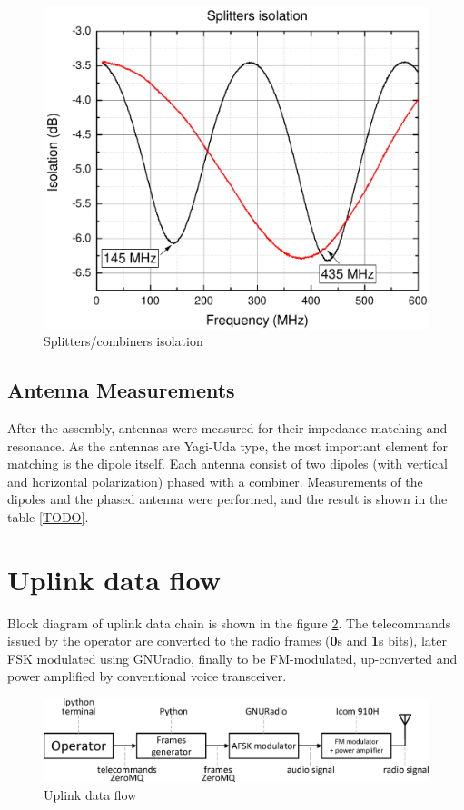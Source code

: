 \begin{figure}
    \centering
    \includegraphics[width=0.6\paperwidth]{img/5/splitter_isolation.pdf}
    \caption{Splitters/combiners isolation}
    \label{splitter_isolation}
\end{figure}


\subsection{Antenna Measurements}
After the assembly, antennas were measured for their impedance matching and resonance. As the antennas are Yagi-Uda type, the most important element for matching is the dipole itself. Each antenna consist of two dipoles (with vertical and horizontal polarization) phased with a combiner. Measurements of the dipoles and the phased antenna were performed, and the result is shown in the table \ref{TODO}.


\section{Uplink data flow}
Block diagram of uplink data chain is shown in the figure \ref{uplink_data_flow}. The telecommands issued by the operator are converted to the radio frames (\textbf{0}s and \textbf{1}s bits), later FSK modulated using GNUradio, finally to be FM-modulated, up-converted and power amplified by conventional voice transceiver.

\begin{figure}
    \centering
    \includegraphics[width=0.6\paperwidth]{img/5/uplink_data_flow.eps}
    \caption{Uplink data flow}
    \label{uplink_data_flow}
\end{figure}

